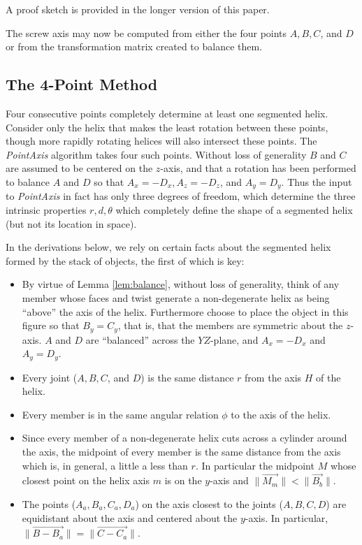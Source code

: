 \documentclass{svproc}
\begin{document}
A proof sketch is provided in the longer version of this paper\cite{readfullsegmentedhelix}.

The screw axis may now
be computed from either the four points $A,B,C$, and $D$ or from the transformation
matrix created to balance them.

\subsection{The 4-Point Method}

Four consecutive points completely determine at least one segmented helix.
Consider
only the helix that makes the least rotation between these points,
though more rapidly rotating helices will also intersect these points.
The {\em PointAxis} algorithm
takes four such points. Without loss of generality $B$ and $C$
are assumed to be centered on the $z$-axis, and that a
rotation has been performed to balance $A$ and $D$ so that $A_x = -D_x, A_z = -D_z$, and $A_y = D_y$. Thus the input to
{\em PointAxis} in fact has only three degrees of freedom, which determine the three intrinsic properties $r,d,\theta$
which completely define the shape of a segmented helix (but not its location in space).


In the derivations below, we rely on certain facts about
the segmented helix formed by the stack of objects, the first
of which is key:
\begin{itemize}
\item By virtue of Lemma \ref{lem:balance}, without loss of generality, think of any member whose faces
  and twist generate a non-degenerate helix as being ``above'' the
  axis of the helix. Furthermore choose to place the object in
  this figure so that $B_y = C_y$, that is, that the members are symmetric
  about the $z$-axis.
  $A$ and $D$ are ``balanced'' across the $YZ$-plane,
  and $A_x = -D_x$ and $A_y = D_y$.
\item Every joint ($A,B,C$, and $D$) is the same distance $r$ from the axis $H$ of the helix.
\item Every member is in the same angular relation $\phi$ to the axis of the helix.
\item Since every member of a non-degenerate helix cuts across a cylinder around the axis,
  the midpoint of every member is the same distance from the axis
  which is, in general, a little a less than $r$. In particular the midpoint $M$
  whose closest point on the helix axis $m$ is on the $y$-axis and
  $\| \overrightarrow{M_m} \| < \| \overrightarrow{B_b} \|$.
\item The points ($A_a,B_a,C_a,D_a$) on the axis closest to the joints ($A,B,C,D$)
  are equidistant about the axis and centered about the $y$-axis. In
  particular, $\| \overrightarrow{B - B_a} \| = \| \overrightarrow{C - C_a} \|$.
\end{itemize}
\end{document}
